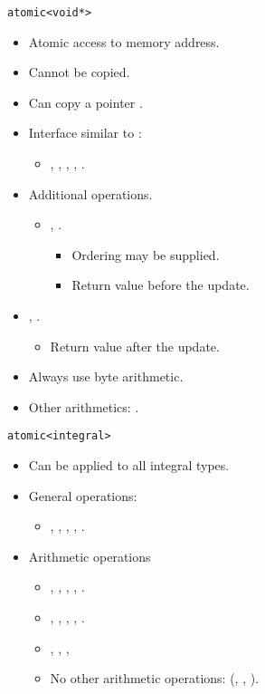 \begin{frame}[t,fragile]{\texttt{atomic<void*>}}
\begin{itemize}
  \item Atomic access to memory address.
  \item Cannot be copied.
  \item Can copy a pointer .
  \item Interface similar to :
    \begin{itemize}
      \item {}, , , ,
            .
    \end{itemize}
  \item Additional operations.
    \begin{itemize}
      \item {}, .
        \begin{itemize}
          \item Ordering may be supplied.
          \item Return value before the update.
        \end{itemize}
    \end{itemize}
      \item \cppid{+=}, \cppid{-=}.
        \begin{itemize}
          \item Return value after the update.
        \end{itemize}
      \item Always use byte arithmetic.
      \item Other arithmetics: .
\end{itemize}
\end{frame}

\begin{frame}[t,fragile]{\texttt{atomic<integral>}}
\begin{itemize}
  \item Can be applied to all integral types.
  \item General operations:
    \begin{itemize}
      \item {}, , , , 
            .
    \end{itemize}
  \item Arithmetic operations
    \begin{itemize}
      \item {}, , , , .
      \item \cppid{+=}, \cppid{-=}, \cppid{\&=}, \cppid{|=}, \cppid{\^{}=}.
      \item {}, , , 
      \item No other arithmetic operations: (\cppid{*}, \cppid{/}, \cppid{\%}).
    \end{itemize}
\end{itemize}
\end{frame}


